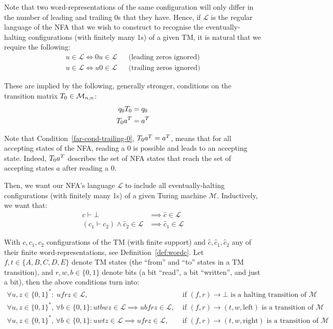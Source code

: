 Note that two word-representations of the same configuration will only differ in the number of leading and trailing 0s that they have. Hence, if $\mathcal{L}$ is the regular language of the NFA that we wish to construct to recognise the eventually-halting configurations (with finitely many 1s) of a given TM, it is natural that we require the following:
\begin{align*}
  u \in \mathcal{L} \iff 0u \in \mathcal{L} &  & \text{(leading zeros ignored)}
  \\
  u \in \mathcal{L} \iff u0 \in \mathcal{L} &  & \text{(trailing zeros ignored)}
\end{align*}

These are implied by the following, generally stronger, conditions on the transition matrix $T_0 \in \mathcal{M}_{n,n}$:
\begin{align}
  q_0 T_0 & = q_0
  \label{far-cond-leading-0}
  \\
  T_0 a^T & = a^T
  \label{far-cond-trailing-0}
\end{align}


Note that Condition~\ref{far-cond-trailing-0}, $T_0 a^T = a^T$, means that for all accepting states of the NFA, reading a 0 is possible and leads to an accepting state. Indeed, $T_0 a^T$ describes the set of NFA states that reach the set of accepting states $a$ after reading a $0$.


Then, we want our NFA's language $\mathcal{L}$ to include all eventually-halting configurations (with finitely many 1s) of a given Turing machine $\mathcal{M}$.  Inductively, we want that:
\begin{align*}
  c\vdash\bot                                    & \implies \hat{c} \in \mathcal{L}  \\
  (c_1\vdash c_2)\land \hat{c}_2 \in \mathcal{L} & \implies\hat{c}_1 \in \mathcal{L}
\end{align*}

With $c, c_1, c_2$ configurations of the TM (with finite support) and $\hat{c}, \hat{c}_1, \hat{c}_2$ any of their finite word-representations, see Definition~\ref{def:wordc}. Let $f,t \in \{A,B,C,D,E\}$ denote TM states (the ``from'' and ``to'' states in a TM transition), and $r,w,b \in \{0,1\}$ denote bits (a bit ``read'', a bit ``written'', and just a bit), then the above conditions turn into:
\begin{align*}
  \forall u,z\in\{0, 1\}^*: \; ufrz \in \mathcal{L},\;                                                           & \text{if $(f,r) \to \bot$ is a halting transition of $\mathcal{M}$}
  \\
  \forall u,z\in\{0, 1\}^*,\,\forall b \in \{0, 1\}: utbwz \in \mathcal{L} \implies ubfrz \in \mathcal{L},\;     & \text{if $(f,r) \to (t,w,\text{left})$ is a transition of $\mathcal{M}$}
  \\
  \forall u,z\in\{0, 1\}^*,\,\forall b \in \{0, 1\}: u w t z \in \mathcal{L} \implies u f r z \in \mathcal{L},\; & \text{if $(f,r) \to (t,w,\text{right})$ is a transition of $\mathcal{M}$}
\end{align*}

